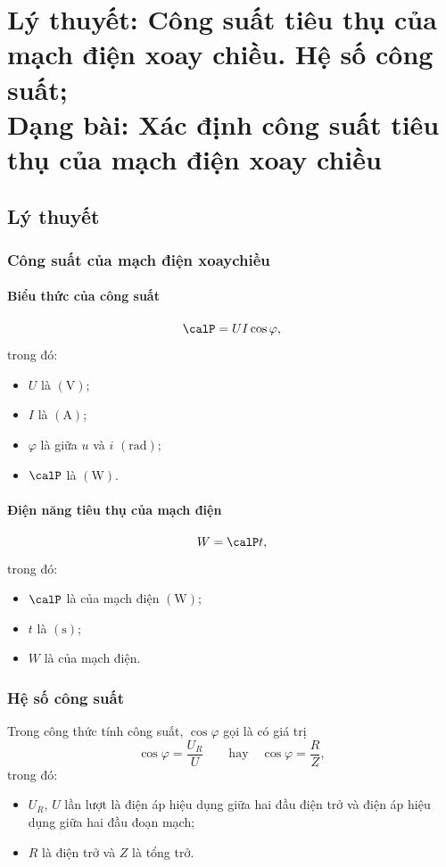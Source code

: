 
\chapter[Lý thuyết: Công suất tiêu thụ của\\ mạch điện xoay chiều. Hệ số công suất;\\Dạng bài: Xác định công suất tiêu thụ của mạch điện xoay chiều]{Lý thuyết: Công suất tiêu thụ của mạch điện xoay chiều. Hệ số công suất;\\Dạng bài: Xác định công suất tiêu thụ của mạch điện xoay chiều}
\section{Lý thuyết}

\subsection{Công suất của mạch điện xoaychiều}
\subsubsection{Biểu thức của công suất}
$$\calP =UI\cos\varphi ,$$
trong đó:
\begin{itemize}
	\item $U$ là  $\left( \si{\volt} \right)$;
	\item $I$ là  $\left(\textrm{A} \right)$;
	\item $\varphi$ là  giữa $u$ và $i$ $\left( \textrm{rad} \right)$;
	\item $\calP$ là  $\left( \si{\watt} \right)$.
\end{itemize}
\subsubsection{Điện năng tiêu thụ của mạch điện}
$$W =\calP t ,$$
trong đó:
\begin{itemize}
	\item $\calP$ là  của mạch điện $\left( \si{\watt} \right)$;
	\item $t$ là  $\left(\textrm{s} \right)$;
	\item $W$ là  của mạch điện.
\end{itemize}
\subsection{Hệ số công suất}
Trong công thức tính công suất, $\cos \varphi$ gọi là  có giá trị 
$$\cos\varphi =\dfrac{U_R}{U}\qquad\textrm{hay}\quad \cos \varphi =\dfrac{R}{Z},$$
trong đó:
\begin{itemize}
	\item $U_R$, $U$ lần lượt là điện áp hiệu dụng giữa hai đầu điện trở và điện áp hiệu dụng giữa hai đầu đoạn mạch;
	\item $R$ là điện trở và $Z$ là tổng trở. 
\end{itemize}	
